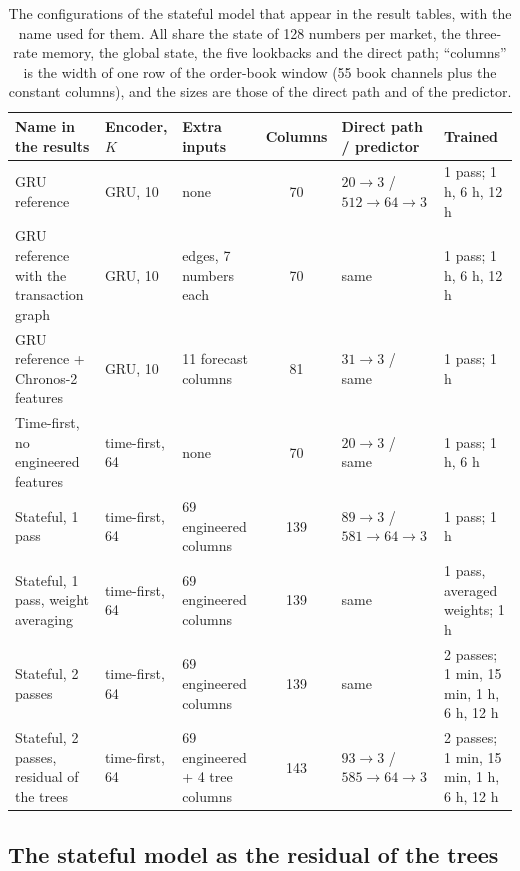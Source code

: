 \begin{table}[t]
\centering
\caption{The configurations of the stateful model that appear in the result tables, with
the name used for them.  All share the state of 128 numbers per market, the three-rate
memory, the global state, the five lookbacks and the direct path; ``columns'' is the width
of one row of the order-book window (55 book channels plus the constant columns), and the
sizes are those of the direct path and of the predictor.}
\label{tab:models:variants}
\footnotesize
\begin{fittable}\begin{tabular}{lllcll}
\toprule
Name in the results & Encoder, $K$ & Extra inputs & Columns & Direct path / predictor & Trained \\
\midrule
GRU reference                         & GRU, 10        & none                      & 70  & $20 \to 3$ / $512 \to 64 \to 3$ & 1 pass; 1 h, 6 h, 12 h \\
GRU reference with the transaction graph & GRU, 10     & edges, 7 numbers each     & 70  & same                    & 1 pass; 1 h, 6 h, 12 h \\
GRU reference + Chronos-2 features    & GRU, 10        & 11 forecast columns       & 81  & $31 \to 3$ / same       & 1 pass; 1 h \\
Time-first, no engineered features          & time-first, 64 & none                      & 70  & $20 \to 3$ / same       & 1 pass; 1 h, 6 h \\
Stateful, 1 pass                      & time-first, 64 & 69 engineered columns           & 139 & $89 \to 3$ / $581 \to 64 \to 3$ & 1 pass; 1 h \\
Stateful, 1 pass, weight averaging    & time-first, 64 & 69 engineered columns           & 139 & same                    & 1 pass, averaged weights; 1 h \\
Stateful, 2 passes                    & time-first, 64 & 69 engineered columns           & 139 & same                    & 2 passes; 1 min, 15 min, 1 h, 6 h, 12 h \\
Stateful, 2 passes, residual of the trees & time-first, 64 & 69 engineered + 4 tree columns & 143 & $93 \to 3$ / $585 \to 64 \to 3$ & 2 passes; 1 min, 15 min, 1 h, 6 h, 12 h \\
\bottomrule
\end{tabular}\end{fittable}
\end{table}

\subsection{The stateful model as the residual of the trees}
\label{sec:models:residual}


